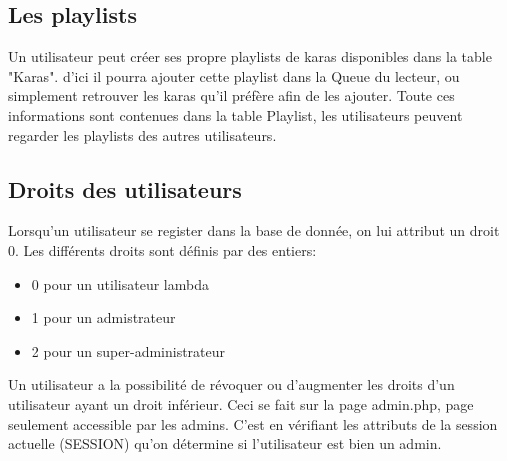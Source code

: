\subsection{Les playlists}

Un utilisateur peut créer ses propre playlists de karas disponibles dans la table "Karas".  d'ici il pourra ajouter cette playlist dans la Queue du lecteur, ou simplement retrouver les karas qu'il préfère afin de les ajouter. Toute ces informations sont contenues dans la table Playlist, les utilisateurs peuvent regarder les playlists des autres utilisateurs. 

\subsection{Droits des utilisateurs}
Lorsqu'un utilisateur se register dans la base de donnée, on lui attribut un droit 0. Les différents droits sont définis par des entiers:
\begin{itemize}
	\item 0 pour un utilisateur lambda
	\item 1 pour un admistrateur
	\item 2 pour un super-administrateur
\end{itemize}
Un utilisateur a la possibilité de révoquer ou d'augmenter les droits d'un utilisateur ayant un droit inférieur. Ceci se fait sur la page admin.php, page seulement accessible par les admins. C'est en vérifiant les attributs de la session actuelle (SESSION) qu'on détermine si l'utilisateur est bien un admin.
